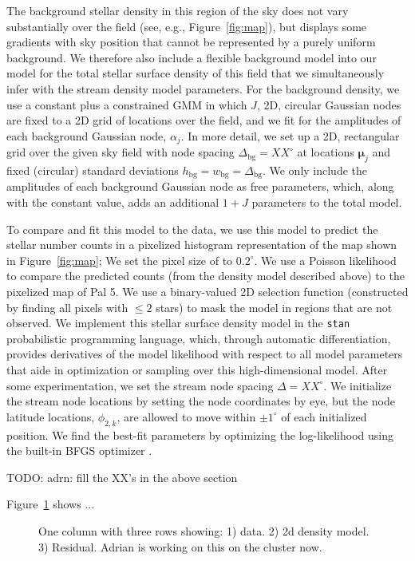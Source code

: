 \documentclass[twocolumn]{aastex62}
\newcommand{\bs}[1]{\boldsymbol{#1}}
\newcommand{\todo}[1]{{\color{red} TODO: #1}}
\begin{document}
The background stellar density in this region of the sky does not vary substantially over the field (see, e.g., Figure~\ref{fig:map}), but displays some gradients with sky position that cannot be represented by a purely uniform background.
We therefore also include a flexible background model into our model for the total stellar surface density of this field that we simultaneously infer with the stream density model parameters.
For the background density, we use a constant plus a constrained GMM in which $J$, 2D, circular Gaussian nodes are fixed to a 2D grid of locations over the field, and we fit for the amplitudes of each background Gaussian node, $\alpha_j$.
In more detail, we set up a 2D, rectangular grid over the given sky field with node spacing $\Delta_{\textrm{bg}} = XX^\circ$ at locations $\bs{\mu}_j$ and fixed (circular) standard deviations $h_{\textrm{bg}} = w_{\textrm{bg}} = \Delta_{\textrm{bg}}$.
We only include the amplitudes of each background Gaussian node as free parameters, which, along with the constant value, adds an additional $1+J$ parameters to the total model.

To compare and fit this model to the data, we use this model to predict the stellar number counts in a pixelized histogram representation of the map shown in Figure~\ref{fig:map}; We set the pixel size of to $0.2^\circ$.
We use a Poisson likelihood to compare the predicted counts (from the density model described above) to the pixelized map of Pal 5.
We use a binary-valued 2D selection function (constructed by finding all pixels with $\leq 2$ stars) to mask the model in regions that are not observed.
We implement this stellar surface density model in the \texttt{stan} \citep{stan} probabilistic programming language, which, through automatic differentiation, provides derivatives of the model likelihood with respect to all model parameters that aide in optimization or sampling over this high-dimensional model.
After some experimentation, we set the stream node spacing $\Delta = XX^\circ$.
We initialize the stream node locations by setting the node coordinates by eye, but the node latitude locations, $\phi_{2, k}$, are allowed to move within $\pm 1^\circ$ of each initialized position.
We find the best-fit parameters by optimizing the log-likelihood using the built-in BFGS optimizer \citep{Press:2007}.

\todo{adrn: fill the XX's in the above section}

Figure~\ref{fig:density-model} shows ...


\begin{figure}
\caption{One column with three rows showing: 1) data. 2) 2d density model. 3) Residual. Adrian is working on this on the cluster now. 
}
\label{fig:density-model}
\end{figure}
\end{document}
